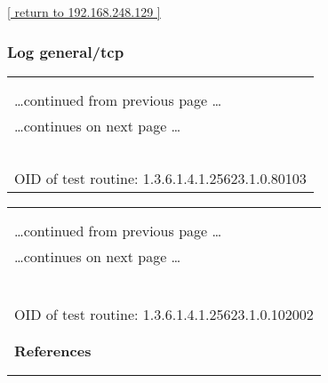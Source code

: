 \documentclass{article}
\begin{document}
\begin{footnotesize}\hyperref[host:192.168.248.129]{[ return to 192.168.248.129 ]}\end{footnotesize}
\subsubsection{Log general/tcp}
\label{port:192.168.248.129 general/tcp Log}

\begin{longtable}{|p{}|}
\hline
\rowcolor{openvas_log}{\color{white}{Log (CVSS: 7.8) }}\\
\rowcolor{openvas_log}{\color{white}{NVT: 3com switch2hub}}\\
\hline
\endfirsthead
\hfill\ldots continued from previous page \ldots \\
\hline
\endhead
\hline
\ldots continues on next page \ldots \\
\endfoot
\hline
\endlastfoot
\\
\rowcolor{white}{\verb=Fake IP address not specified. Skipping this check. =}\\
\rowcolor{white}{\verb==}\\
\rowcolor{white}{\verb==}\\
\\
OID of test routine: 1.3.6.1.4.1.25623.1.0.80103\\
\end{longtable}

\begin{longtable}{|p{}|}
\hline
\rowcolor{openvas_log}{\color{white}{Log (CVSS: 0.0) }}\\
\rowcolor{openvas_log}{\color{white}{NVT: OS fingerprinting}}\\
\hline
\endfirsthead
\hfill\ldots continued from previous page \ldots \\
\hline
\endhead
\hline
\ldots continues on next page \ldots \\
\endfoot
\hline
\endlastfoot
\\
\rowcolor{white}{\verb=ICMP based OS fingerprint results: (91% confidence)=}\\
\rowcolor{white}{\verb=Linux Kernel=}\\
\rowcolor{white}{\verb==}\\
\rowcolor{white}{\verb==}\\
\\
OID of test routine: 1.3.6.1.4.1.25623.1.0.102002\\
\\

      \hline
      \\
\textbf{References}\\
\rowcolor{white}{\verb=Other:=}\\
\rowcolor{white}{\verb=  URL:http://www.phrack.org/issues.html?issue=\verb-=-\verb=57&amp;id=\verb-=-\verb=7#article=}\\
\end{longtable}
\end{document}
